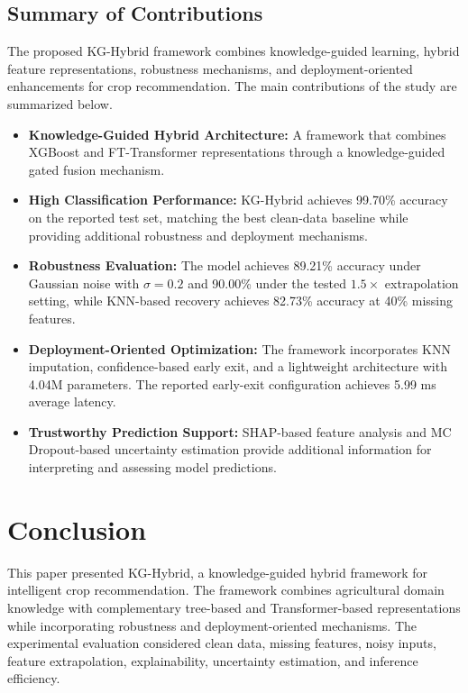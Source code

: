 \documentclass[journal]{IEEEtran}
\begin{document}
\subsection{Summary of Contributions}

The proposed KG-Hybrid framework combines knowledge-guided learning, hybrid feature representations, robustness mechanisms, and deployment-oriented enhancements for crop recommendation. The main contributions of the study are summarized below.

\begin{itemize}[leftmargin=1.2em]
    \item \textbf{Knowledge-Guided Hybrid Architecture:} A framework that combines XGBoost and FT-Transformer representations through a knowledge-guided gated fusion mechanism.

    \item \textbf{High Classification Performance:} KG-Hybrid achieves 99.70\% accuracy on the reported test set, matching the best clean-data baseline while providing additional robustness and deployment mechanisms.

    \item \textbf{Robustness Evaluation:} The model achieves 89.21\% accuracy under Gaussian noise with $\sigma=0.2$ and 90.00\% under the tested $1.5\times$ extrapolation setting, while KNN-based recovery achieves 82.73\% accuracy at 40\% missing features.

    \item \textbf{Deployment-Oriented Optimization:} The framework incorporates KNN imputation, confidence-based early exit, and a lightweight architecture with 4.04M parameters. The reported early-exit configuration achieves 5.99 ms average latency.

    \item \textbf{Trustworthy Prediction Support:} SHAP-based feature analysis and MC Dropout-based uncertainty estimation provide additional information for interpreting and assessing model predictions.
\end{itemize}
\section{Conclusion}

This paper presented KG-Hybrid, a knowledge-guided hybrid framework for intelligent crop recommendation. The framework combines agricultural domain knowledge with complementary tree-based and Transformer-based representations while incorporating robustness and deployment-oriented mechanisms. The experimental evaluation considered clean data, missing features, noisy inputs, feature extrapolation, explainability, uncertainty estimation, and inference efficiency.
\end{document}
